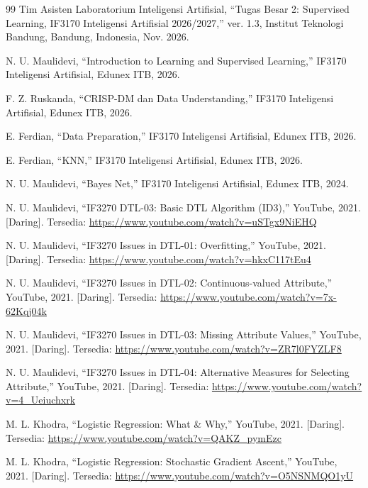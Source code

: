 \renewcommand{\refname}{Daftar Pustaka}
\begin{thebibliography}{99}
Tim Asisten Laboratorium Inteligensi Artifisial, ``Tugas Besar 2: Supervised Learning, IF3170 Inteligensi Artifisial 2026/2027,'' ver. 1.3, Institut Teknologi Bandung, Bandung, Indonesia, Nov. 2026.

N. U. Maulidevi, ``Introduction to Learning and Supervised Learning,'' IF3170 Inteligensi Artifisial, Edunex ITB, 2026.

F. Z. Ruskanda, ``CRISP-DM dan Data Understanding,'' IF3170 Inteligensi Artifisial, Edunex ITB, 2026.

E. Ferdian, ``Data Preparation,'' IF3170 Inteligensi Artifisial, Edunex ITB, 2026.

E. Ferdian, ``KNN,'' IF3170 Inteligensi Artifisial, Edunex ITB, 2026.

N. U. Maulidevi, ``Bayes Net,'' IF3170 Inteligensi Artifisial, Edunex ITB, 2024.

N. U. Maulidevi, ``IF3270 DTL-03: Basic DTL Algorithm (ID3),'' YouTube, 2021. [Daring]. Tersedia: \url{https://www.youtube.com/watch?v=uSTgx9NiEHQ}

N. U. Maulidevi, ``IF3270 Issues in DTL-01: Overfitting,'' YouTube, 2021. [Daring]. Tersedia: \url{https://www.youtube.com/watch?v=hkxC117tEu4}

N. U. Maulidevi, ``IF3270 Issues in DTL-02: Continuous-valued Attribute,'' YouTube, 2021. [Daring]. Tersedia: \url{https://www.youtube.com/watch?v=7x-62Kqj04k}

N. U. Maulidevi, ``IF3270 Issues in DTL-03: Missing Attribute Values,'' YouTube, 2021. [Daring]. Tersedia: \url{https://www.youtube.com/watch?v=ZR7l0FYZLF8}

N. U. Maulidevi, ``IF3270 Issues in DTL-04: Alternative Measures for Selecting Attribute,'' YouTube, 2021. [Daring]. Tersedia: \url{https://www.youtube.com/watch?v=4_Ueiuchxrk}

M. L. Khodra, ``Logistic Regression: What \& Why,'' YouTube, 2021. [Daring]. Tersedia: \url{https://www.youtube.com/watch?v=QAKZ_pymEzc}

M. L. Khodra, ``Logistic Regression: Stochastic Gradient Ascent,'' YouTube, 2021. [Daring]. Tersedia: \url{https://www.youtube.com/watch?v=O5NSNMQO1yU}


\end{thebibliography}
